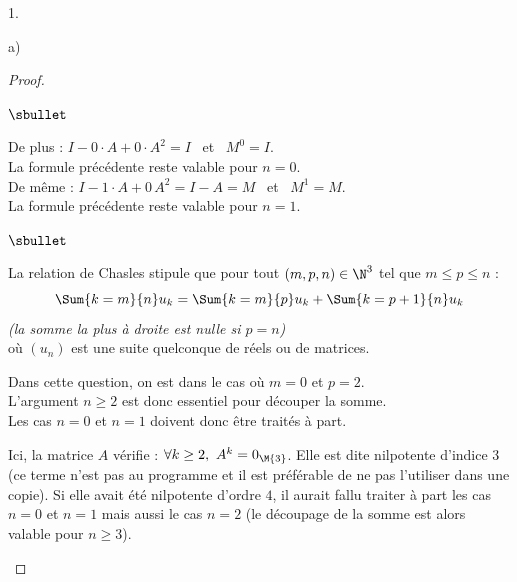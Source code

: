 \documentclass[11pt]{article}%
\begin{document}
\begin{noliste}{1.}
\begin{noliste}{a)}
\begin{proof}
\begin{noliste}{$\sbullet$}
      \item De plus : $I - 0 \cdot A + 0 \cdot A^2 = I$ \ et \ $M^0 = I$.\\
        La formule précédente reste valable pour $n = 0$. \\[.2cm]
        De même : $I - 1 \cdot A + 0 \, A^2 = I -A = M$ \ et \ $M^1 = M$.\\
        La formule précédente reste valable pour $n = 1$.%
      \end{noliste}
      \begin{remarkL}{.98}%
        \begin{noliste}{$\sbullet$}
        \item La \og relation de Chasles \fg{} stipule que pour tout
          $(m, p, n) \in \N^3$ tel que $m \leq p \leq n$ :
          \[
          \Sum{k = m}{n} u_k = \Sum{k = m}{p} u_k + \Sum{k = p+1}{n}
          u_k
          \]
          {\it (la somme la plus à droite est nulle si $p = n$)}\\
          où $(u_n)$ est une suite quelconque de réels ou de matrices.
        \item Dans cette question, on est dans le cas où $m = 0$ et $p
          = 2$.\\
          L'argument $n \geq 2$ est donc essentiel pour découper la
          somme.\\
          Les cas $n = 0$ et $n = 1$ doivent donc être traités à part.
        \item Ici, la matrice $A$ vérifie : $\forall k \geq 2, \ A^k =
          0_{\M{3}}$. Elle est dite nilpotente d'indice $3$ (ce terme
          n'est pas au programme et il est préférable de ne pas
          l'utiliser dans une copie). Si elle avait été nilpotente
          d'ordre $4$, il aurait fallu traiter à part les cas $n = 0$
          et $n = 1$ mais aussi le cas $n = 2$ (le découpage de la
          somme est alors valable pour $n \geq 3$).
        \end{noliste}
      \end{remarkL}


      \newpage



\end{proof}
\end{noliste}
\end{noliste}
\end{document}
